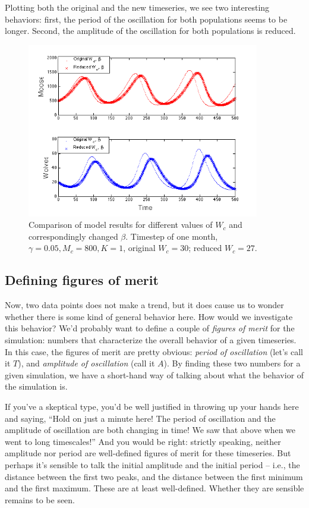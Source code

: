 \documentclass{tufte-handout}
\begin{document}
Plotting both the original and the new timeseries, we see two interesting behaviors: first, the period of the oscillation for both populations seems to be longer.  Second, the amplitude of the oscillation for both populations is reduced.
\begin{figure}[h!]
\includegraphics[width=4in]{figs/MooseBCTimeSeries}
\caption{Comparison of model results for different values of  $W_c$ and correspondingly changed 
$\beta$.  Timestep of one month,  $\gamma = 0.05, M_c = 800, K=1$, original $W_c = 30$; reduced
$W_c = 27$.}
\end{figure}

\subsection{Defining figures of merit}

Now, two data points does not make a trend, but it does cause us to wonder whether there is some kind of general behavior here.  How would we investigate this behavior?  We'd probably want to define a couple of {\em figures of merit} for the simulation:  numbers that characterize the overall behavior of a given timeseries.  In this case, the figures of merit are pretty obvious:  {\em period of oscillation} (let's call it $T$), and {\em amplitude of oscillation} (call it $A$).  By finding these two numbers for a given simulation, we have a short-hand way of talking about what the behavior of the simulation is.


If you've a skeptical type, you'd be well justified in throwing up your hands here and saying, ``Hold on just a minute here!  The period of oscillation and the amplitude of oscillation are both changing in time!  We saw that above when we went to long timescales!''  And you would be right:  strictly speaking, neither amplitude nor period are well-defined figures of merit for these timeseries.  But perhaps it's sensible to talk the initial amplitude and the initial period -- i.e., the distance between the first two peaks, and the distance between the first minimum and the first maximum.  These are at least well-defined.  Whether they are sensible remains to be seen.
\end{document}
